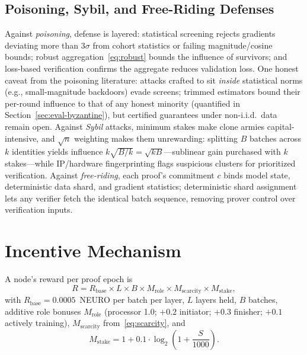 \documentclass[conference]{IEEEtran}
\begin{document}
\subsection{Poisoning, Sybil, and Free-Riding Defenses}

Against \emph{poisoning}, defense is layered: statistical screening rejects gradients deviating more than $3\sigma$ from cohort statistics or failing magnitude/cosine bounds; robust aggregation~\eqref{eq:robust} bounds the influence of survivors; and loss-based verification confirms the aggregate reduces validation loss. One honest caveat from the poisoning literature: attacks crafted to sit \emph{inside} statistical norms (e.g., small-magnitude backdoors) evade screens; trimmed estimators bound their per-round influence to that of any honest minority (quantified in Section~\ref{sec:eval-byzantine}), but certified guarantees under non-i.i.d.\ data remain open. Against \emph{Sybil} attacks, minimum stakes make clone armies capital-intensive, and $\sqrt{n}$ weighting makes them unrewarding: splitting $B$ batches across $k$ identities yields influence $k\sqrt{B/k} = \sqrt{kB}$---sublinear gain purchased with $k$ stakes---while IP/hardware fingerprinting flags suspicious clusters for prioritized verification. Against \emph{free-riding}, each proof's commitment $c$ binds model state, deterministic data shard, and gradient statistics; deterministic shard assignment lets any verifier fetch the identical batch sequence, removing prover control over verification inputs.

\section{Incentive Mechanism}
\label{sec:incentives}

A node's reward per proof epoch is
\begin{equation}
R = R_{\text{base}} \times L \times B \times M_{\text{role}} \times M_{\text{scarcity}} \times M_{\text{stake}}, \label{eq:reward}
\end{equation}
with $R_{\text{base}} = 0.0005$~NEURO per batch per layer, $L$ layers held, $B$ batches, additive role bonuses $M_{\text{role}}$ (processor 1.0; $+0.2$ initiator; $+0.3$ finisher; $+0.1$ actively training), $M_{\text{scarcity}}$ from~\eqref{eq:scarcity}, and
\begin{equation}
M_{\text{stake}} = 1 + 0.1 \cdot \log_2\!\left(1 + \frac{S}{1000}\right). \label{eq:stake}
\end{equation}
\end{document}
